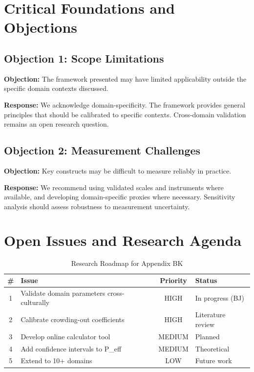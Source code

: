 \section{Critical Foundations and Objections}
\label{sec:method-calc-foundations}

\subsection{Objection 1: Scope Limitations}

\textbf{Objection:} The framework presented may have limited applicability
outside the specific domain contexts discussed.

\textbf{Response:} We acknowledge domain-specificity. The framework provides
general principles that should be calibrated to specific contexts. Cross-domain
validation remains an open research question.

\subsection{Objection 2: Measurement Challenges}

\textbf{Objection:} Key constructs may be difficult to measure reliably in
practice.

\textbf{Response:} We recommend using validated scales and instruments where
available, and developing domain-specific proxies where necessary. Sensitivity
analysis should assess robustness to measurement uncertainty.


\section{Open Issues and Research Agenda}
\label{sec:calc-open}

\begin{table}[htbp]
\centering
\caption{Research Roadmap for Appendix BK}
\label{tab:calc-roadmap}
\renewcommand{\arraystretch}{1.3}
\begin{tabular}{@{}clcl@{}}
\toprule
\textbf{\#} & \textbf{Issue} & \textbf{Priority} & \textbf{Status} \\
\midrule
1 & Validate domain parameters cross-culturally & HIGH & In progress (BJ) \\
2 & Calibrate crowding-out coefficients & HIGH & Literature review \\
3 & Develop online calculator tool & MEDIUM & Planned \\
4 & Add confidence intervals to P\_eff & MEDIUM & Theoretical \\
5 & Extend to 10+ domains & LOW & Future work \\
\bottomrule
\end{tabular}
\end{table}


